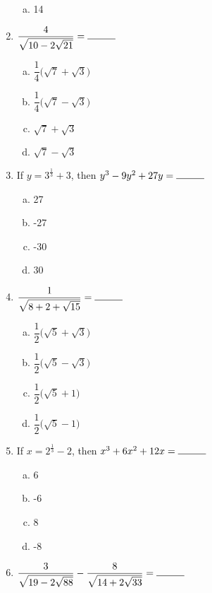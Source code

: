 \begin{multicols}{2}
\begin{enumerate}
\begin{multicols}{2}
\begin{enumerate}[(a)]
\item 14
\end{enumerate}
\end{multicols}
\item $\dfrac{4}{\sqrt{10-2\sqrt{21}}} = \rule{1cm}{0.15mm}$
\begin{multicols}{2}
\begin{enumerate}[(a)]
\item $\dfrac{1}{4}\Big(\sqrt{7}+\sqrt{3}\Big) $
\item $\dfrac{1}{4}\Big(\sqrt{7}-\sqrt{3}\Big)$
\item $\sqrt{7}+\sqrt{3}$
\item $\sqrt{7}-\sqrt{3}$
\end{enumerate}
\end{multicols}
\item If $y = 3^\frac{1}{3}+3$, then $y^3-9y^2+27y = \rule{1cm}{0.15mm}$
\begin{multicols}{2}
\begin{enumerate}[(a)]
\item 27
\item -27
\item -30
\item 30
\end{enumerate}
\end{multicols}
\item $\dfrac{1}{\sqrt{8+2+\sqrt{15}}} = \rule{1cm}{0.15mm}$
\begin{multicols}{2}
\begin{enumerate}[(a)]
\item $\dfrac{1}{2}\Big(\sqrt{5}+\sqrt{3}\Big)$
\item  $\dfrac{1}{2}\Big(\sqrt{5}-\sqrt{3}\Big)$
\item  $\dfrac{1}{2}\Big(\sqrt{5}+1\Big)$
\item  $\dfrac{1}{2}\Big(\sqrt{5}-1\Big)$
\end{enumerate}
\end{multicols}
\item If $x = 2^\frac{1}{3}-2$, then $x^3+6x^2+12x = \rule{1cm}{0.15mm}$
\begin{multicols}{2}
\begin{enumerate}[(a)]
\item 6
\item -6
\item 8
\item -8
\end{enumerate}
\end{multicols}
\item $\dfrac{3}{\sqrt{19-2\sqrt{88}}}-\dfrac{8}{\sqrt{14+2\sqrt{33}}} = \rule{1cm}{0.15mm}$

\end{enumerate}
\end{multicols}
